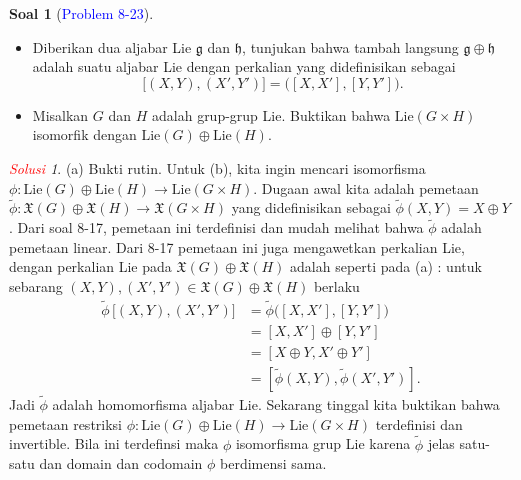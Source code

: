 \documentclass[11pt]{article}
\theoremstyle{definition}
\newtheorem*{problem}{Soal}
\theoremstyle{remark}
\newtheorem*{solution}{\textcolor{red}{Solusi}}
\newcommand{\Lie}{\text{Lie}}               %
\newcommand{\LieG}{\text{Lie}(G)}           %
\newcommand{\LieH}{\text{Lie}(H)}               %
\begin{document}
\begin{problem}[\textcolor{blue}{Problem 8-23}]
\begin{itemize}
    \item [(a)] Diberikan dua aljabar Lie $\mathfrak{g}$ dan $\mathfrak{h}$, tunjukan bahwa tambah langsung $\mathfrak{g} \oplus \mathfrak{h}$ adalah suatu aljabar Lie dengan perkalian yang didefinisikan sebagai
    $$
    \big[(X,Y),(X',Y')\big] = \big([X,X'],[Y,Y']\big).
    $$
    
    \item [(b)] Misalkan $G$ dan $H$ adalah grup-grup Lie. Buktikan bahwa $\text{Lie}(G\times H)$ isomorfik dengan $\text{Lie}(G) \oplus \text{Lie}(H)$.
\end{itemize}
\end{problem}
\begin{solution}
(a) Bukti rutin. Untuk (b), kita ingin mencari isomorfisma $\phi : \LieG \oplus \LieH \to \Lie(G \times H)$. Dugaan awal kita adalah pemetaan $\widetilde{\phi} : \mathfrak{X}(G) \oplus \mathfrak{X}(H) \to \mathfrak{X}(G \times H)$ yang didefinisikan sebagai $\widetilde{\phi}(X,Y) = X\oplus Y$. Dari soal 8-17, pemetaan ini terdefinisi dan mudah melihat bahwa $\widetilde{\phi}$ adalah pemetaan linear. Dari 8-17 pemetaan ini juga mengawetkan perkalian Lie, dengan perkalian Lie pada $\mathfrak{X}(G) \oplus \mathfrak{X}(H)$ adalah seperti pada (a) : untuk sebarang $(X,Y) ,(X',Y') \in \mathfrak{X}(G) \oplus \mathfrak{X}(H)$ berlaku
\begin{align*}
    \widetilde{\phi}\, \big[(X,Y),(X',Y') \big] &= \widetilde{\phi}\big( [X,X'],[Y,Y'] \big) \\ &=  [X,X'] \oplus [Y,Y'] \\ &= [X \oplus Y, X' \oplus Y'] \\ &= [\widetilde{\phi}(X,Y), \widetilde{\phi}(X',Y')].
\end{align*}
Jadi $\widetilde{\phi}$ adalah homomorfisma aljabar Lie. Sekarang tinggal kita buktikan bahwa pemetaan restriksi $ \phi : \LieG \oplus \LieH \to \Lie(G \times H)$ terdefinisi dan invertible. Bila ini terdefinsi maka $\phi$ isomorfisma grup Lie karena $\widetilde{\phi}$ jelas satu-satu dan domain dan codomain $\phi$ berdimensi sama.


\end{solution}
\end{document}
